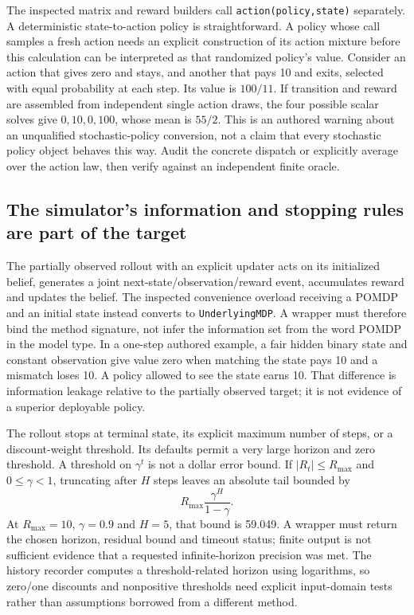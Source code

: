 The inspected matrix and reward builders call \texttt{action(policy,state)}
separately. A deterministic state-to-action policy is straightforward. A
policy whose call samples a fresh action needs an explicit construction of
its action mixture before this calculation can be interpreted as that
randomized policy's value. Consider an action that gives zero and stays,
and another that pays 10 and exits, selected with equal probability at each
step. Its value is $100/11$. If transition and reward are assembled from
independent single action draws, the four possible scalar solves give
$0,10,0,100$, whose mean is $55/2$. This is an authored warning about an
unqualified stochastic-policy conversion, not a claim that every stochastic
policy object behaves this way. Audit the concrete dispatch or explicitly
average over the action law, then verify against an independent finite oracle.
\citep{exec24_policyother_tools,exec24_policyother_contract}

\subsection{The simulator's information and stopping rules are part of the target}
The partially observed rollout with an explicit updater acts on its initialized
belief, generates a joint next-state/observation/reward event, accumulates
reward and updates the belief. The inspected convenience overload receiving
a POMDP and an initial state instead converts to \texttt{UnderlyingMDP}.
A wrapper must therefore bind the method signature, not infer the information
set from the word POMDP in the model type. In a one-step authored example,
a fair hidden binary state and constant observation give value zero when
matching the state pays 10 and a mismatch loses 10. A policy allowed to see
the state earns 10. That difference is information leakage relative to the
partially observed target; it is not evidence of a superior deployable policy.
\citep{exec24_policyother_tools,exec24_policyother_contract}

The rollout stops at terminal state, its explicit maximum number of steps,
or a discount-weight threshold. Its defaults permit a very large horizon
and zero threshold. A threshold on $\gamma^t$ is not a dollar error bound.
If $|R_t|\leq R_{\max}$ and $0\leq\gamma<1$, truncating after $H$ steps leaves
an absolute tail bounded by
\[
 R_{\max}\frac{\gamma^H}{1-\gamma}.
\]
At $R_{\max}=10$, $\gamma=0.9$ and $H=5$, that bound is 59.049. A wrapper must
return the chosen horizon, residual bound and timeout status; finite output
is not sufficient evidence that a requested infinite-horizon precision was
met. The history recorder computes a threshold-related horizon using
logarithms, so zero/one discounts and nonpositive thresholds need explicit
input-domain tests rather than assumptions borrowed from a different method.
\citep{exec24_policyother_tools,exec24_policyother_contract}


